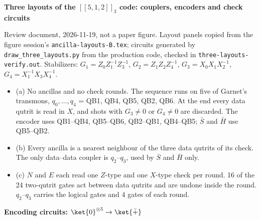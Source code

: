 \documentclass[11pt]{article}
\begin{document}
{\large\bfseries Three layouts of the $[[5,1,2]]_3$ code: couplers, encoders and check circuits}\par
{\small Review document, 2026-11-19, not a paper figure. Layout panels copied from the figure session's
\texttt{ancilla-layouts-B.tex}; circuits generated by \texttt{draw\_three\_layouts.py} from the production code,
checked in \texttt{three-layouts-verify.out}. Stabilizers: \textcolor{ZText}{$G_1 = Z_0 Z_1^{-1} Z_3^{-1}$},
\textcolor{ZText}{$G_2 = Z_1 Z_2 Z_4^{-1}$}, \textcolor{XText}{$G_3 = X_0 X_1 X_2^{-1}$},
\textcolor{XText}{$G_4 = X_1^{-1} X_3 X_4^{-1}$}.}\par\vspace{10pt}
\begin{center}

\end{center}
\vspace{6pt}
{\small
\begin{itemize}\setlength{\itemsep}{2pt}
\item (a) No ancillas and no check rounds. The sequence runs on five of Garnet's transmons,
  $q_0, \dots, q_4$ = QB1, QB4, QB5, QB2, QB6. At the end every data qutrit is read in $X$, and shots
  with $G_3 \neq 0$ or $G_4 \neq 0$ are discarded. The encoder uses QB1--QB4, QB5--QB6, QB2--QB1,
  QB4--QB5; $\bar S$ and $\bar H$ use QB5--QB2.
\item (b) Every ancilla is a nearest neighbour of the three data qutrits of its check. The only
  data--data coupler is $q_2$--$q_3$, used by $\bar S$ and $\bar H$ only.
\item (c) $N$ and $E$ each read one $Z$-type and one $X$-type check per round. 16 of the 24
  two-qutrit gates act between data qutrits and are undone inside the round.
  $q_2$--$q_3$ carries the logical gates and 4 gates of each round.
\end{itemize}}
\clearpage
{\large\bfseries Encoding circuits: $\ket{0}^{\otimes 5} \to \ket{\bar +}$}\par\vspace{6pt}
\end{document}
